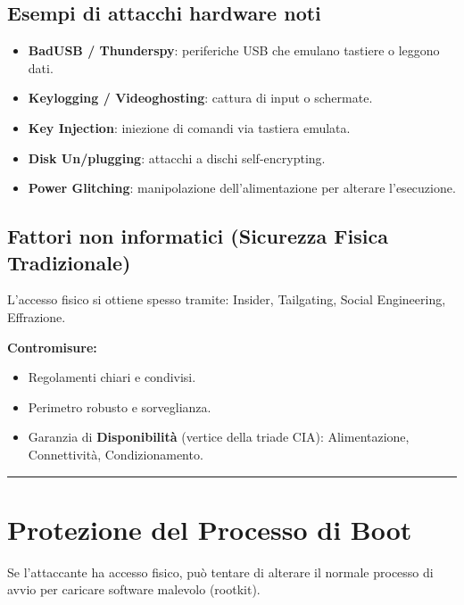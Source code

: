 \documentclass[12pt, a4paper]{report}
\begin{document}
\subsection{Esempi di attacchi hardware noti}
\begin{itemize}
	\item \textbf{BadUSB / Thunderspy}: periferiche USB che emulano tastiere o leggono dati.
	\item \textbf{Keylogging / Videoghosting}: cattura di input o schermate.
	\item \textbf{Key Injection}: iniezione di comandi via tastiera emulata.
	\item \textbf{Disk Un/plugging}: attacchi a dischi self-encrypting.
	\item \textbf{Power Glitching}: manipolazione dell'alimentazione per alterare l'esecuzione.
\end{itemize}

\subsection{Fattori non informatici (Sicurezza Fisica Tradizionale)}
L'accesso fisico si ottiene spesso tramite: Insider, Tailgating, Social Engineering, Effrazione.

\textbf{Contromisure:}
\begin{itemize}
	\item Regolamenti chiari e condivisi.
	\item Perimetro robusto e sorveglianza.
	\item Garanzia di \textbf{Disponibilità} (vertice della triade CIA): Alimentazione, Connettività, Condizionamento.
\end{itemize}

\noindent\rule{\textwidth}{0.4pt}

\section{Protezione del Processo di Boot}

Se l'attaccante ha accesso fisico, può tentare di alterare il normale processo di avvio per caricare software malevolo (rootkit).
\end{document}
